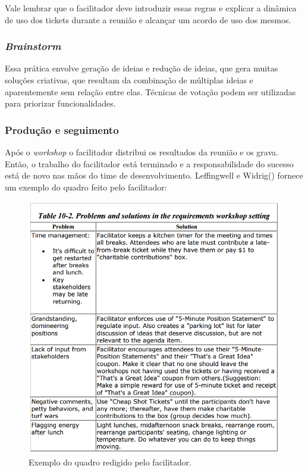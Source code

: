 	Vale lembrar que o facilitador deve introduzir essas regras e explicar a 
	dinâmica de uso dos tickets durante a reunião e alcançar um acordo de uso dos mesmos.
	
      \subsubsection{\textit{Brainstorm}}
	
	Essa prática envolve geração de ideias e redução de ideias, que gera muitas soluções criativas, 
	que resultam da combinação de múltiplas ideias e aparentemente sem relação entre elas. 
	Técnicas de votação podem ser utilizadas para priorizar funcionalidades.
      
      \subsubsection{Produção e seguimento}
      
	Após o \textit{workshop} o facilitador distribui os resultados da reunião e os grava. 
	Então, o trabalho do facilitador está terminado e a responsabilidade do sucesso está de novo nas mãos do time de desenvolvimento. 
	Leffingwell e Widrig(\citeyear{leffingwell99}) fornece um exemplo do quadro feito pelo facilitador:
	
	\begin{figure}[!htbp]
	  \centering
	  \includegraphics[scale=0.25]{editaveis/figuras/problems_solutions}
	  \caption[Exemplo do quadro redigido pelo facilitador]
	    {Exemplo do quadro redigido pelo facilitador.\footnotemark}
	  \label{problems_solutions}
	\end{figure}
	
